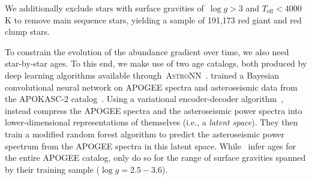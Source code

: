 We additionally exclude stars with surface gravities of~$\log g > 3$ and
$T_\text{eff} < 4000$ K to remove main sequence stars, yielding a sample
of 191,173 red giant and red clump stars.
\par
To constrain the evolution of the abundance gradient over time, we also need
star-by-star ages.
To this end, we make use of two age catalogs, both produced by deep
learning algorithms available through~\textsc{AstroNN}~\citep{Leung2019}.
\citet{Mackereth2019b} trained a Bayesian convolutional neural network on
APOGEE spectra and asteroseismic data from the APOKASC-2
catalog~\citep{Pinsonneault2018}.
Using a variational encoder-decoder algorithm~\citep[e.g.,][]{LeCun2015},
\citet{Leung2023} instead compress the APOGEE spectra and the asteroseismic
power spectra into lower-dimensional representations of themselves (i.e., a
\textit{latent space}).
They then train a modified random forest algorithm to predict the
asteroseismic power spectrum from the APOGEE spectra in this latent space.
While~\citet{Mackereth2019b} infer ages for the entire APOGEE catalog,
\citet{Leung2023} only do so for the range of surface gravities spanned by
their training sample ($\log g = 2.5 - 3.6$).

